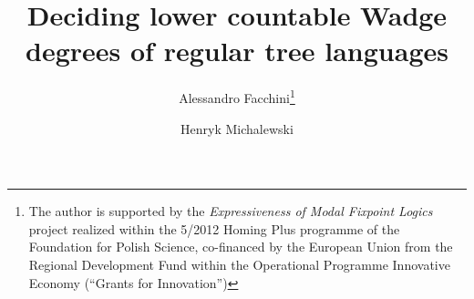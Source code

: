 \documentclass{llncs}
\begin{document}
\frontmatter          

\pagestyle{headings}  

\addtocmark{} 

\mainmatter            

\title{Deciding lower countable Wadge degrees of regular tree languages}


\author{Alessandro Facchini\thanks{The author is supported by the \emph{Expressiveness of Modal Fixpoint Logics} project realized within the 5/2012 Homing Plus programme of the Foundation for Polish Science, co-financed by the European Union from the Regional Development Fund within the Operational Programme Innovative Economy (``Grants for Innovation'')} \and Henryk Michalewski}


\maketitle              














\end{document}
